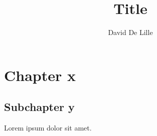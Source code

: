 \documentclass[letterpaper]{article}
\author{David De Lille}
\title{Title}
\begin{document}
\maketitle

\section{Chapter x}
\subsection{Subchapter y}
Lorem ipsum dolor sit amet.
\end{document}
